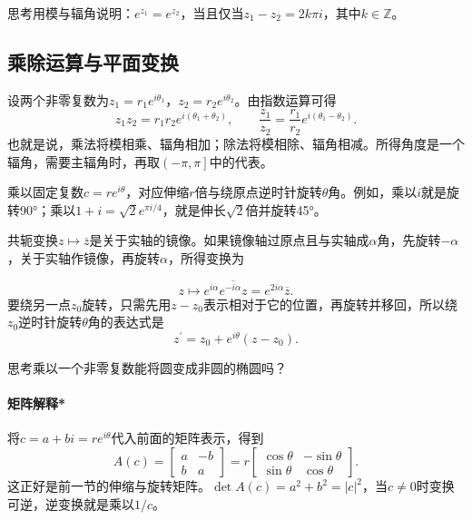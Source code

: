 {\kaiti{}思考\quad 用模与辐角说明：\(e^{z_{1}} = e^{z_{2}}\)，当且仅当\(z_{1} - z_{2} = 2 k \pi i\)，其中\(k \in \mathbb{Z}\)。}

\subsection{乘除运算与平面变换}
设两个非零复数为\(z_{1} = r_{1} e^{i \theta_{1}}\)，\(z_{2} = r_{2} e^{i \theta_{2}}\)。由指数运算可得
\begin{equation}
    z_{1} z_{2} = r_{1} r_{2} e^{i \left( \theta_{1} + \theta_{2} \right)} , \qquad
    \frac{z_{1}}{z_{2}} = \frac{r_{1}}{r_{2}} e^{i \left( \theta_{1} - \theta_{2} \right)} .
\end{equation}
也就是说，乘法将模相乘、辐角相加；除法将模相除、辐角相减。所得角度是一个辐角，需要主辐角时，再取\(\left( - \pi , \pi \right]\)中的代表。

\begin{samepage}
乘以固定复数\(c = r e^{i \theta}\)，对应伸缩\(r\)倍与绕原点逆时针旋转\(\theta\)角。例如，乘以\(i\)就是旋转90°；乘以\(1 + i = \sqrt{2} e^{\pi i / 4}\)，就是伸长\(\sqrt{2}\)倍并旋转45°。
\par
\end{samepage}

\begin{samepage}
共轭变换\(z \mapsto \overline{z}\)是关于实轴的镜像。如果镜像轴过原点且与实轴成\(\alpha\)角，先旋转\(- \alpha\)，关于实轴作镜像，再旋转\(\alpha\)，所得变换为
\par
\end{samepage}
\begin{equation}
    z \longmapsto e^{i \alpha} \overline{e^{- i \alpha} z} = e^{2 i \alpha} \overline{z} .
\end{equation}
要绕另一点\(z_{0}\)旋转，只需先用\(z - z_{0}\)表示相对于它的位置，再旋转并移回，所以绕\(z_{0}\)逆时针旋转\(\theta\)角的表达式是
\begin{equation}\label{eq:complex-rotation-center}
    z^{\prime} = z_{0} + e^{i \theta} \left( z - z_{0} \right) .
\end{equation}

{\kaiti{}思考\quad 乘以一个非零复数能将圆变成非圆的椭圆吗？}

\paragraph{矩阵解释*} \mbox{}\nopagebreak[4]

将\(c = a + b i = r e^{i \theta}\)代入前面的矩阵表示，得到
\begin{equation}
    A \left( c \right) = \left[ \begin{matrix}a & - b \\ b & a\end{matrix} \right]
    = r \left[ \begin{matrix}\cos \theta & - \sin \theta \\ \sin \theta & \cos \theta\end{matrix} \right] .
\end{equation}
这正好是前一节的伸缩与旋转矩阵。\(\det A \left( c \right) = a^{2} + b^{2} = \left| c \right|^{2}\)，当\(c \ne 0\)时变换可逆，逆变换就是乘以\(1 / c\)。

